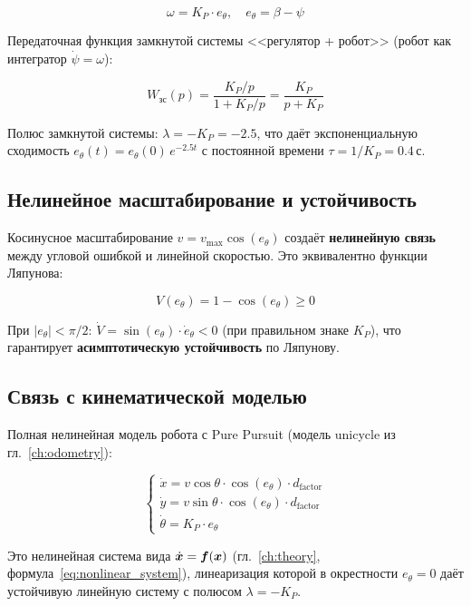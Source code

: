 \begin{equation}
  \omega = K_P \cdot e_\theta, \quad e_\theta = \beta - \psi
  \label{eq:pp_closed_loop}
\end{equation}

Передаточная функция замкнутой системы <<регулятор + робот>>
(робот как интегратор $\dot{\psi} = \omega$):

\begin{equation}
  W_{\text{зс}}(p) = \frac{K_P / p}{1 + K_P / p} = \frac{K_P}{p + K_P}
  \label{eq:pp_tf}
\end{equation}

Полюс замкнутой системы: $\lambda = -K_P = -2.5$,
что даёт экспоненциальную сходимость $e_\theta(t) = e_\theta(0)\,e^{-2.5t}$
с постоянной времени $\tau = 1/K_P = 0.4\,\text{с}$.

\subsection{Нелинейное масштабирование и устойчивость}

Косинусное масштабирование $v = v_{\max}\cos(e_\theta)$ создаёт
\textbf{нелинейную связь} между угловой ошибкой и линейной скоростью.
Это эквивалентно функции Ляпунова:

\begin{equation}
  V(e_\theta) = 1 - \cos(e_\theta) \geq 0
  \label{eq:pp_lyapunov}
\end{equation}

При $|e_\theta| < \pi/2$: $\dot{V} = \sin(e_\theta)\cdot\dot{e}_\theta < 0$
(при правильном знаке $K_P$), что гарантирует
\textbf{асимптотическую устойчивость} по Ляпунову.

\subsection{Связь с кинематической моделью}

Полная нелинейная модель робота с Pure Pursuit
(модель unicycle из гл.~\ref{ch:odometry}):

\begin{equation}
  \begin{cases}
    \dot{x} = v\cos\theta \cdot \cos(e_\theta) \cdot d_{\text{factor}} \\
    \dot{y} = v\sin\theta \cdot \cos(e_\theta) \cdot d_{\text{factor}} \\
    \dot{\theta} = K_P \cdot e_\theta
  \end{cases}
  \label{eq:pp_full_model}
\end{equation}

Это нелинейная система вида $\dot{\bm{x}} = \bm{f}(\bm{x})$
(гл.~\ref{ch:theory}, формула~\eqref{eq:nonlinear_system}),
линеаризация которой в окрестности $e_\theta = 0$ даёт
устойчивую линейную систему с полюсом $\lambda = -K_P$.
